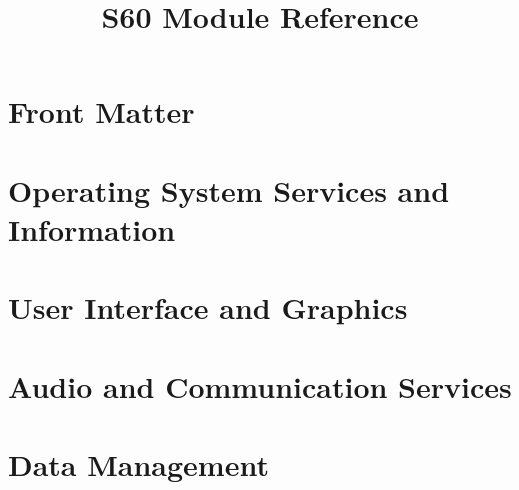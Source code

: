 \documentclass{manual}
\title{S60 Module Reference}
\begin{document}
\maketitle

\ifhtml
\chapter*{Front Matter\label{front}}
\fi


\begin{abstract}
\noindent

\end{abstract}

\tableofcontents



\chapter{Operating System Services and Information \label{s60os}}




\chapter{User Interface and Graphics \label{s60graph}}












\chapter{Audio and Communication Services \label{s60ac}}









\chapter{Data Management \label{s60data}}






\end{document}
